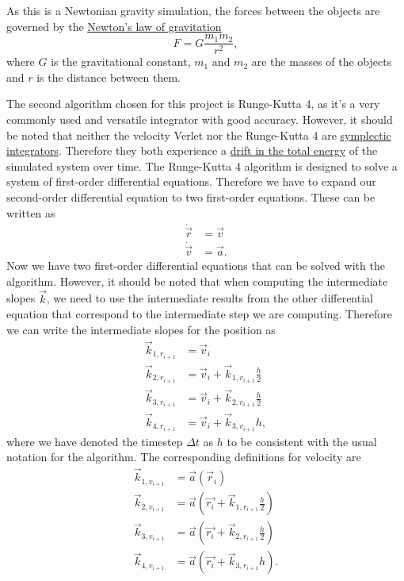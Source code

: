 \documentclass[a4paper]{article}
\begin{document}
As this is a Newtonian gravity simulation, the forces between the objects are governed by the
\href{https://en.wikipedia.org/wiki/Newton\%27s_law_of_universal_gravitation}{Newton's law of gravitation}
\begin{equation}
F = G \frac{m_1 m_2}{r^2},
\end{equation}
where $G$ is the gravitational constant, $m_1$ and $m_2$ are the masses of the objects and $r$ is the distance between them.

The second algorithm chosen for this project is Runge-Kutta 4, as it's a very commonly used and versatile integrator with good accuracy.
However, it should be noted that neither the velocity Verlet nor the Runge-Kutta 4 are
\href{https://en.wikipedia.org/wiki/Symplectic_integrator}{symplectic integrators}.
Therefore they both experience a
\href{https://en.wikipedia.org/wiki/Energy_drift}{drift in the total energy}
of the simulated system over time.
The Runge-Kutta 4 algorithm is designed to solve a system of first-order differential equations.
Therefore we have to expand our second-order differential equation to two first-order equations.
These can be written as
\begin{align}
\dot{\vec{r}} &= \vec{v} \\
\dot{\vec{v}} &= \vec{a}.
\end{align}
Now we have two first-order differential equations that can be solved with the algorithm.
However, it should be noted that when computing the intermediate slopes $\vec{k}$, we need to use the intermediate results from the other differential equation that correspond to the intermediate step we are computing.
Therefore we can write the intermediate slopes for the position as
\begin{align}
\vec{k}_{1,r_{i+1}} &= \vec{v}_i \\
\vec{k}_{2,r_{i+1}} &= \vec{v}_i + \vec{k}_{1,v_{i+1}} \frac{h}{2} \\
\vec{k}_{3,r_{i+1}} &= \vec{v}_i + \vec{k}_{2,v_{i+1}} \frac{h}{2} \\
\vec{k}_{4,r_{i+1}} &= \vec{v}_i + \vec{k}_{3,v_{i+1}} h,
\end{align}
where we have denoted the timestep $\Delta t$ as $h$ to be consistent with the usual notation for the algorithm.
The corresponding definitions for velocity are
\begin{align}
\vec{k}_{1,v_{i+1}} &= \vec{a}(\vec{r}_i) \\
\vec{k}_{2,v_{i+1}} &= \vec{a}(\vec{r_i}+\vec{k}_{1,r_{i+1}} \frac{h}{2}) \\
\vec{k}_{3,v_{i+1}} &= \vec{a}(\vec{r_i}+\vec{k}_{2,r_{i+1}} \frac{h}{2}) \\
\vec{k}_{4,v_{i+1}} &= \vec{a}(\vec{r_i}+\vec{k}_{3,r_{i+1}} h).
\end{align}
\end{document}
